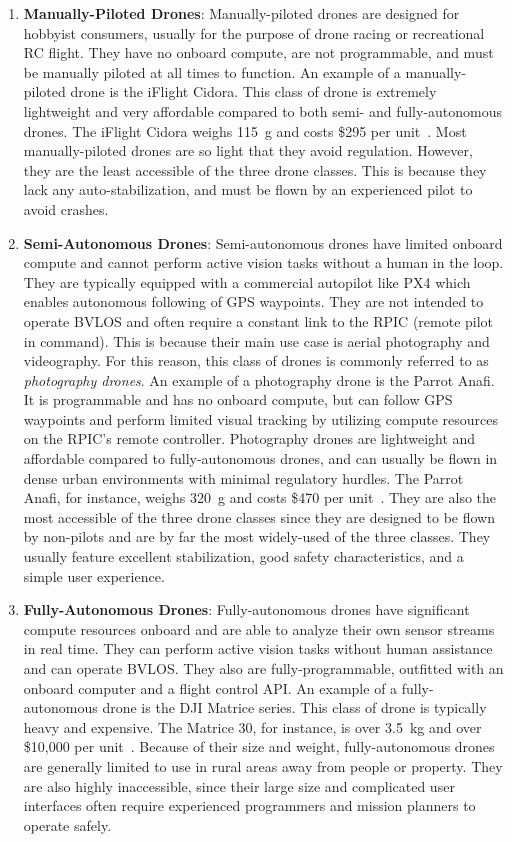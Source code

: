 \begin{enumerate}
    \item \textbf{Manually-Piloted Drones}: Manually-piloted drones are designed for hobbyist consumers, usually for the purpose of drone racing or recreational RC flight. They have no onboard compute, are not programmable, and must be manually piloted at all times to function. An example of a manually-piloted drone is the iFlight Cidora. This class of drone is extremely lightweight and very affordable compared to both semi- and fully-autonomous drones. The iFlight Cidora weighs 115~g and costs \$295 per unit~\cite{Cidora}. Most manually-piloted drones are so light that they avoid regulation. However, they are the least accessible of the three drone classes. This is because they lack any auto-stabilization, and must be flown by an experienced pilot to avoid crashes.
    \item \textbf{Semi-Autonomous Drones}: Semi-autonomous drones have limited onboard compute and cannot perform active vision tasks without a human in the loop. They are typically equipped with a commercial autopilot like PX4 which enables autonomous following of GPS waypoints. They are not intended to operate BVLOS and often require a constant link to the RPIC (remote pilot in command). This is because their main use case is aerial photography and videography. For this reason, this class of drones is commonly referred to as \textit{photography drones}. An example of a photography drone is the Parrot Anafi. It is programmable and has no onboard compute, but can follow GPS waypoints and perform limited visual tracking by utilizing compute resources on the RPIC's remote controller. Photography drones are lightweight and affordable compared to fully-autonomous drones, and can usually be flown in dense urban environments with minimal regulatory hurdles. The Parrot Anafi, for instance, weighs 320~g and costs \$470 per unit~\cite{ParrotAnafi}. They are also the most accessible of the three drone classes since they are designed to be flown by non-pilots and are by far the most widely-used of the three classes. They usually feature excellent stabilization, good safety characteristics, and a simple user experience. 
    \item \textbf{Fully-Autonomous Drones}: Fully-autonomous drones have significant compute resources onboard and are able to analyze their own sensor streams in real time. They can perform active vision tasks without human assistance and can operate BVLOS. They also are fully-programmable, outfitted with an onboard computer and a flight control API. An example of a fully-autonomous drone is the DJI Matrice series. This class of drone is typically heavy and expensive. The Matrice 30, for instance, is over 3.5~kg and over \$10,000 per unit~\cite{Matrice30T}. Because of their size and weight, fully-autonomous drones are generally limited to use in rural areas away from people or property. They are also highly inaccessible, since their large size and complicated user interfaces often require experienced programmers and mission planners to operate safely. 
\end{enumerate}
